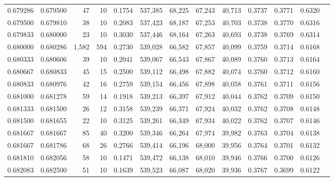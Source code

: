 \begin{tabular}{rrrrrrrrrrrrr}
0.679286 & 0.679500 &    47 &  10 &                                     0.1754 & 537,385 &  68,225 &  67,243 &  40,713 & 0.3737 & 0.3771 & 0.6320 \\
0.679500 & 0.679810 &    38 &  10 &                                     0.2083 & 537,423 &  68,187 &  67,253 &  40,703 & 0.3738 & 0.3770 & 0.6316 \\
0.679833 & 0.680000 &    23 &  10 &                                     0.3030 & 537,446 &  68,164 &  67,263 &  40,693 & 0.3738 & 0.3769 & 0.6314 \\
0.680000 & 0.680286 & 1,582 & 594 &                                     0.2730 & 539,028 &  66,582 &  67,857 &  40,099 & 0.3759 & 0.3714 & 0.6168 \\
0.680333 & 0.680606 &    39 &  10 &                                     0.2041 & 539,067 &  66,543 &  67,867 &  40,089 & 0.3760 & 0.3713 & 0.6164 \\
0.680667 & 0.680833 &    45 &  15 &                                     0.2500 & 539,112 &  66,498 &  67,882 &  40,074 & 0.3760 & 0.3712 & 0.6160 \\
0.680833 & 0.680976 &    42 &  16 &                                     0.2759 & 539,154 &  66,456 &  67,898 &  40,058 & 0.3761 & 0.3711 & 0.6156 \\
0.681000 & 0.681278 &    59 &  14 &                                     0.1918 & 539,213 &  66,397 &  67,912 &  40,044 & 0.3762 & 0.3709 & 0.6150 \\
0.681333 & 0.681500 &    26 &  12 &                                     0.3158 & 539,239 &  66,371 &  67,924 &  40,032 & 0.3762 & 0.3708 & 0.6148 \\
0.681500 & 0.681655 &    22 &  10 &                                     0.3125 & 539,261 &  66,349 &  67,934 &  40,022 & 0.3762 & 0.3707 & 0.6146 \\
0.681667 & 0.681667 &    85 &  40 &                                     0.3200 & 539,346 &  66,264 &  67,974 &  39,982 & 0.3763 & 0.3704 & 0.6138 \\
0.681667 & 0.681786 &    68 &  26 &                                     0.2766 & 539,414 &  66,196 &  68,000 &  39,956 & 0.3764 & 0.3701 & 0.6132 \\
0.681810 & 0.682056 &    58 &  10 &                                     0.1471 & 539,472 &  66,138 &  68,010 &  39,946 & 0.3766 & 0.3700 & 0.6126 \\
0.682083 & 0.682500 &    51 &  10 &                                     0.1639 & 539,523 &  66,087 &  68,020 &  39,936 & 0.3767 & 0.3699 & 0.6122 \\

\end{tabular}
